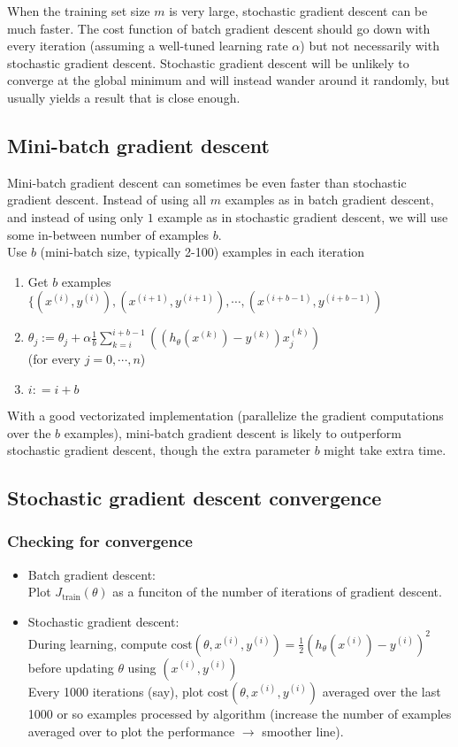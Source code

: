 When the training set size $m$ is very large, stochastic gradient descent can be much faster. The cost function of batch gradient descent should go down with every iteration (assuming a well-tuned learning rate $\alpha$) but not necessarily with stochastic gradient descent. Stochastic gradient descent will be unlikely to converge at the global minimum and will instead wander around it randomly, but usually yields a result that is close enough.

%
\subsection{Mini-batch gradient descent}
Mini-batch gradient descent can sometimes be even faster than stochastic gradient descent. Instead of using all $m$ examples as in batch gradient descent, and instead of using only $1$ example as in stochastic gradient descent, we will use some in-between number of examples $b$.
\\
Use $b$ (mini-batch size, typically 2-100) examples in each iteration
\begin{enumerate}
\item
    Get $b$ examples $\{(x^{(i)}, y^{(i)}), (x^{(i+1)}, y^{(i+1)}), \cdots, (x^{(i+b-1)}, y^{(i+b-1)})$
\item
    $\theta_j := \theta_j + \alpha\frac{1}{b}\sum_{k=i}^{i+b-1}((h_\theta(x^{(k)}) - y^{(k)}) x_j^{(k)})$\\
    (for every $j=0, \cdots, n$)
\item
    $i: = i+b$
\end{enumerate}

With a good vectorizated implementation (parallelize the gradient computations over the $b$ examples), mini-batch gradient descent is likely to outperform stochastic gradient descent, though the extra parameter $b$ might take extra time.

%
\subsection{Stochastic gradient descent convergence}
\subsubsection{Checking for convergence}
\begin{itemize}
\item[]
Batch gradient descent:\\
Plot $J_\text{train}(\theta)$ as a funciton of the number of iterations of gradient descent.
\item[]
Stochastic gradient descent:\\
During learning, compute ${\text{cost}}(\theta, x^{(i)}, y^{(i)}) = \frac{1}{2}(h_{\theta}(x^{(i)}) -y^{(i)})^2$ before updating $\theta$ using $(x^{(i)}, y^{(i)})$\\
Every 1000 iterations (say), plot ${\text{cost}}(\theta, x^{(i)}, y^{(i)})$ averaged over the last 1000 or so examples processed by algorithm (increase the number of examples averaged over to plot the performance $\rightarrow$ smoother line).
\end{itemize}

